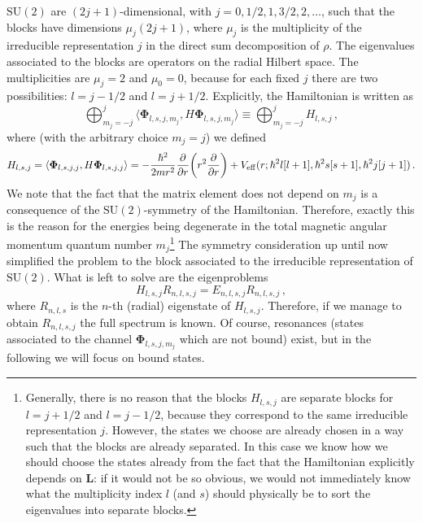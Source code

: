 \documentclass[fontsize=12pt,
               twoside=false,
               BCOR=0mm,
               DIV=14,
               overfullrule=true, %
               toc=bibliography,
               headinclude=true,
               footinclude=false]{scrartcl}
\numberwithin{equation}{section}
\begin{document}
    $\mathrm{SU}(2)$ are $(2j+1)$-dimensional, with
    $j=0,1\slash{2},1,3\slash{2},2,\dots$, such that the blocks have dimensions
    $\mu_j(2j+1)$, where $\mu_j$ is the multiplicity of the irreducible
    representation $j$ in the direct sum decomposition of $\rho$. The
    eigenvalues associated to the blocks are operators on the radial Hilbert
    space. The multiplicities are $\mu_{j}=2$ and $\mu_0=0$, because for each
    fixed $j$ there are two possibilities: $l=j-1\slash{2}$ and
    $l=j+1\slash{2}$. Explicitly, the Hamiltonian is written as
    \begin{equation}
        \bigoplus^j_{m_j=-j}
        \langle \bm{\Phi}_{l,s,j,m_j}, H \bm{\Phi}_{l,s,j,m_j} \rangle
        \equiv
        \bigoplus^j_{m_j=-j} H_{l,s,j}
    \,,
    \end{equation}
    where (with the arbitrary choice $m_j=j$) we defined
    \begin{equation}
        H_{l,s,j}
        =
        \langle \bm{\Phi}_{l,s,j,j}, H \bm{\Phi}_{l,s,j,j} \rangle
        =
        -\frac{\hbar^2}{2mr^2}\pdv{r}(r^2\pdv{r})
        +
        V_\mathrm{eff}(r;\hbar^2l[l+1],\hbar^2s[s+1],\hbar^2j[j+1])
    \,.
    \end{equation}
    We note that the fact that the matrix element does not depend on $m_j$ is a
    consequence of the $\mathrm{SU}(2)$-symmetry of the Hamiltonian. Therefore,
    exactly this is the reason for the energies being degenerate in the total
    magnetic angular momentum quantum number $m_j$\footnote{Generally, there is
    no reason that the blocks $H_{l,s,j}$ are separate blocks for
    $l=j+1\slash{2}$ and $l=j-1\slash{2}$, because they correspond to the same
    irreducible representation $j$. However, the states we choose are already
    chosen in a way such that the blocks are already separated. In this case we
    know how we should choose the states already from the fact that the
    Hamiltonian explicitly depends on $\bm{L}$: if it would not be so obvious,
    we would not immediately know what the multiplicity index $l$ (and $s$)
    should physically be to sort the eigenvalues into separate blocks.} The
    symmetry consideration up until now simplified the problem to the block
    associated to the irreducible representation of $\mathrm{SU}(2)$. What is
    left to solve are the eigenproblems
    \begin{equation}\label{eq:radialEigenproblem}
        H_{l,s,j} R_{n,l,s,j} = E_{n,l,s,j} R_{n,l,s,j}
    \,,
    \end{equation}
    where $R_{n,l,s}$ is the $n$-th (radial) eigenstate of $H_{l,s,j}$.
    Therefore, if we manage to obtain $R_{n,l,s,j}$ the full spectrum is known.
    Of course, resonances (states associated to the channel
    $\bm{\Phi}_{l,s,j,m_j}$ which are not bound) exist, but in the following we
    will focus on bound states.
\end{document}
